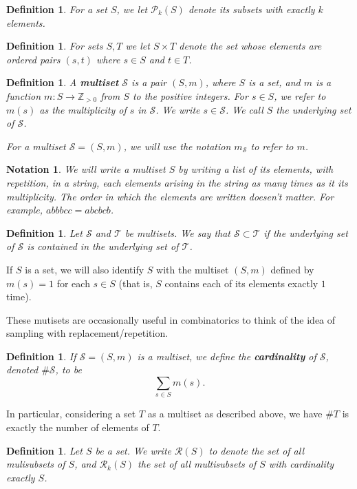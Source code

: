 \documentclass[12pt]{report}
\theoremstyle{plain}
\newtheorem{defn}[thm]{Definition}
\newtheorem{notn}[thm]{Notation}
\newcommand{\ms}[1]{\mathscr #1}
\newcommand{\Xb}[1]{\textbf{#1}\index{#1}}
\begin{document}
\begin{defn}
For a set $S$, we let $\ms P_k(S)$ denote its subsets with exactly $k$
elements.
\end{defn}

\begin{defn}
For sets $S, T$ we let $S \times T$ denote the set whose elements are
ordered pairs $(s, t)$ where $s \in S$ and $t \in T$.
\end{defn}

\begin{defn}
A \Xb{multiset} $\ms S$ is a pair $(S, m)$, where $S$ is a set, and $m$ is a
function $m: S \to \mathbb Z_{> 0}$ from $S$ to the positive integers. For
$s \in S$, we refer to $m(s)$ as the multiplicity of $s$ in $\ms S$. We
write $s \in \ms S$. We call $S$ the underlying set of $\ms S$.

For a multiset $\ms S = (S, m)$, we will use the notation $m_{\ms S}$ to
refer to $m$.
\end{defn}

\begin{notn}
We will write a multiset $S$ by writing a list of its elements, with
repetition, in a string, each elements arising in the string as many times
as it its multiplicity. The order in which the elements are written
doesen't matter. For example, $abbbcc = abcbcb$.
\end{notn}

\begin{defn}
Let $\ms S$ and $\ms T$ be multisets. We say that $\ms S \subset \ms T$ if
the underlying set of $\ms S$ is contained in the underlying set of $\ms
T$.
\end{defn}

If $S$ is a set, we will also identify $S$ with the multiset $(S, m)$
defined by $m(s) = 1$ for each $s \in S$ (that is, $S$ contains each of its
elements exactly $1$ time).

These mutisets are occasionally useful in combinatorics to think of the
idea of sampling with replacement/repetition.

\begin{defn}
If $\ms S = (S, m)$ is a multiset, we define the \Xb{cardinality} of $\ms
S$, denoted  $\#\ms S$, to be
\[ \sum_{s \in S} m(s). \]
\end{defn}
In particular, considering a set $T$ as a multiset as described above, we
have $\# T$ is exactly the number of elements of $T$.

\begin{defn} \label{multisubsets definition}
Let $S$ be a set. We write $\ms R(S)$ to denote the set of all mulisubsets
of $S$, and $\ms R_k(S)$ the set of all multisubsets of $S$ with
cardinality exactly $S$.
\end{defn}
\end{document}
